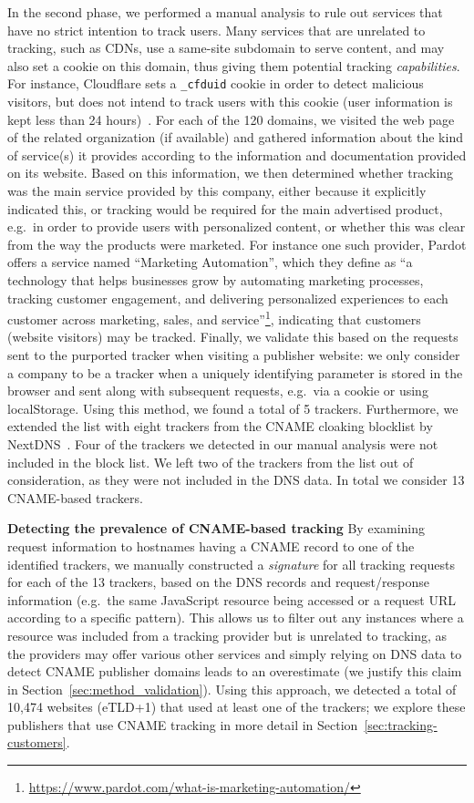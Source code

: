 In the second phase, we performed a manual analysis to rule out services that have no strict intention to track users. 
Many services that are unrelated to tracking, such as CDNs, use a same-site subdomain to serve content, and may also set a cookie on this domain, thus giving them potential tracking \emph{capabilities}.
For instance, Cloudflare sets a \texttt{\_cfduid} cookie in order to detect malicious visitors, but does not intend to track users with this cookie (user information is kept less than 24 hours)~\cite{cloudflarecookies}.
For each of the 120 domains, we visited the web page of the related organization (if available) and gathered information about the kind of service(s) it provides according to the information and documentation provided on its website.
Based on this information, we then determined whether tracking was the main service provided by this company, either because it explicitly indicated this, or tracking would be required for the main advertised product, e.g.\ in order to provide users with personalized content, or whether this was clear from the way the products were marketed.
For instance one such provider, Pardot offers a service named ``Marketing Automation'', which they define as ``a technology that helps businesses grow by automating marketing processes, tracking customer engagement, and delivering personalized experiences to each customer across marketing, sales, and service''\footnote{\url{https://www.pardot.com/what-is-marketing-automation/}}, indicating that customers (website visitors) may be tracked.
Finally, we validate this based on the requests sent to the purported tracker when visiting a publisher website: we only consider a company to be a tracker when a uniquely identifying parameter is stored in the browser and sent along with subsequent requests, e.g.\ via a cookie or using localStorage.
Using this method, we found a total of 5 trackers. 
Furthermore, we extended the list with eight trackers from the CNAME cloaking blocklist by NextDNS~\cite{nextdnscnamecloakinggithub,nextdnscnamecloaking}. Four of the trackers we detected in our manual analysis were not included in the block list. We left two of the trackers from the list out of consideration, as they were not included in the DNS data.
In total we consider 13 CNAME-based trackers.


\noindent \textbf{Detecting the prevalence of CNAME-based tracking}
By examining request information to hostnames having a CNAME record to one of the identified trackers, we manually constructed a \emph{signature} for all tracking requests for each of the 13 trackers, based on the DNS records and request/response information (e.g.\ the same JavaScript resource being accessed or a request URL according to a specific pattern).
This allows us to filter out any instances where a resource was included from a tracking provider but is unrelated to tracking, as the providers may offer various other services and simply relying on DNS data to detect CNAME publisher domains leads to an overestimate (we justify this claim in Section~\ref{sec:method_validation}).
Using this approach, we detected a total of 10,474 websites (eTLD+1) that used at least one of the trackers; we explore these publishers that use CNAME tracking in more detail in Section~\ref{sec:tracking-customers}.

